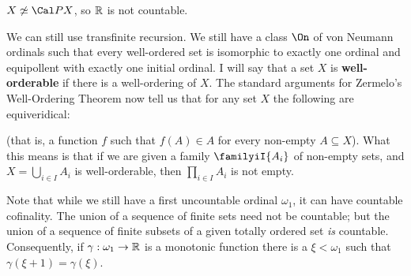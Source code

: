 
\noindent{}$X\not\simeq\Cal PX$, so $\Bbb R$ is not countable.

We can still use transfinite recursion.
We still have a class
$\On$ of von Neumann ordinals such that every well-ordered set is
isomorphic to exactly one
ordinal and equipollent with
exactly one initial ordinal.
I will say that a set $X$ is {\bf well-orderable} if there is a
well-ordering of $X$.   The standard
arguments for Zermelo's Well-Ordering Theorem now
tell us that for any set $X$ the following are equiveridical:


\noindent (that is, a function $f$ such that
$f(A)\in A$ for every non-empty $A\subseteq X$).
What this means is that if we are given a family $\familyiI{A_i}$
of non-empty sets, and $X=\bigcup_{i\in I}A_i$ is
well-orderable, then
$\prod_{i\in I}A_i$ is not empty.

Note that while we still have a first uncountable ordinal
$\omega_1$, it can have countable cofinality.
The union of a sequence of finite sets need not be
countable;   but the union
of a sequence of finite subsets of a given totally ordered set {\it is}
countable.   Consequently, if
$\gamma:\omega_1\to\Bbb R$ is a monotonic function there is a
$\xi<\omega_1$ such that $\gamma(\xi+1)=\gamma(\xi)$.

